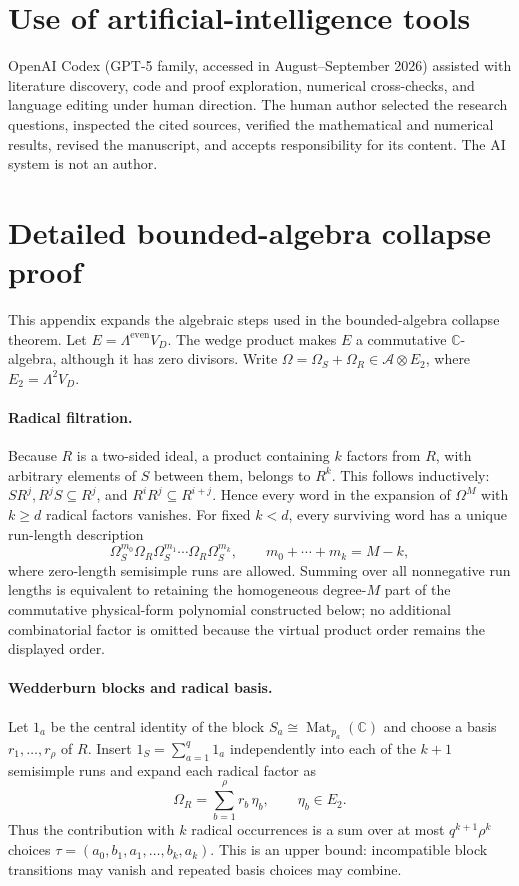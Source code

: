 \documentclass[aps,pra,reprint,superscriptaddress,nofootinbib,longbibliography,showkeys]{revtex4-2}
\theoremstyle{definition}
\newcommand{\Mat}{\operatorname{Mat}}
\begin{document}
\section*{Use of artificial-intelligence tools}

OpenAI Codex (GPT-5 family, accessed in August--September 2026) assisted with
literature discovery, code and proof exploration, numerical cross-checks, and
language editing under human direction.  The human author selected the
research questions, inspected the cited sources, verified the mathematical
and numerical results, revised the manuscript, and accepts responsibility for
its content.  The AI system is not an author.

\appendix
\section{Detailed bounded-algebra collapse proof}
\label{app:wm-proof}

This appendix expands the algebraic steps used in the bounded-algebra collapse
theorem.  Let $E=\Lambda^{\mathrm{even}}V_D$.  The wedge product makes $E$ a
commutative $\mathbb C$-algebra, although it has zero divisors.  Write
$\Omega=\Omega_S+\Omega_R\in\mathcal A\otimes E_2$, where $E_2=\Lambda^2V_D$.

\paragraph{Radical filtration.}
Because $R$ is a two-sided ideal, a product containing $k$ factors from $R$,
with arbitrary elements of $S$ between them, belongs to $R^k$.  This follows
inductively: $SR^j,R^jS\subseteq R^j$, and
$R^iR^j\subseteq R^{i+j}$.  Hence every word in the expansion of $\Omega^M$
with $k\ge d$ radical factors vanishes.  For fixed $k<d$, every surviving word
has a unique run-length description
\[
 \Omega_S^{m_0}\Omega_R\Omega_S^{m_1}\cdots
 \Omega_R\Omega_S^{m_k},\qquad
 m_0+\cdots+m_k=M-k,
\]
where zero-length semisimple runs are allowed.  Summing over all nonnegative
run lengths is equivalent to retaining the homogeneous degree-$M$ part of the
commutative physical-form polynomial constructed below; no additional
combinatorial factor is omitted because the virtual product order remains the
displayed order.

\paragraph{Wedderburn blocks and radical basis.}
Let $1_a$ be the central identity of the block
$S_a\cong\Mat_{p_a}(\mathbb C)$ and choose a basis
$r_1,\ldots,r_\rho$ of $R$.  Insert
$1_S=\sum_{a=1}^q1_a$ independently into each of the $k+1$ semisimple runs and
expand each radical factor as
\[
 \Omega_R=\sum_{b=1}^{\rho}r_b\,\eta_b,
 \qquad \eta_b\in E_2.
\]
Thus the contribution with $k$ radical occurrences is a sum over at most
$q^{k+1}\rho^k$ choices
$\tau=(a_0,b_1,a_1,\ldots,b_k,a_k)$.  This is an upper bound: incompatible
block transitions may vanish and repeated basis choices may combine.
\end{document}

